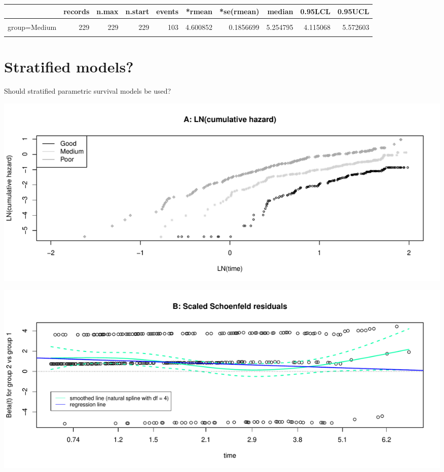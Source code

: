 \documentclass[]{article}
\begin{document}
\begin{table}[H]
\centering
\begin{tabular}{lrrrrrrrrr}
\toprule
  & records & n.max & n.start & events & *rmean & *se(rmean) & median & 0.95LCL & 0.95UCL\\
\midrule
\cellcolor{gray!6}{group=Good} & \cellcolor{gray!6}{229} & \cellcolor{gray!6}{229} & \cellcolor{gray!6}{229} & \cellcolor{gray!6}{51} & \cellcolor{gray!6}{5.934330} & \cellcolor{gray!6}{0.1616003} & \cellcolor{gray!6}{NA} & \cellcolor{gray!6}{NA} & \cellcolor{gray!6}{NA}\\
group=Medium & 229 & 229 & 229 & 103 & 4.600852 & 0.1856699 & 5.254795 & 4.115068 & 5.572603\\
\cellcolor{gray!6}{group=Poor} & \cellcolor{gray!6}{228} & \cellcolor{gray!6}{228} & \cellcolor{gray!6}{228} & \cellcolor{gray!6}{145} & \cellcolor{gray!6}{3.101736} & \cellcolor{gray!6}{0.1772520} & \cellcolor{gray!6}{2.183562} & \cellcolor{gray!6}{1.978082} & \cellcolor{gray!6}{2.619178}\\
\bottomrule
\end{tabular}
\end{table}

\newpage

\section{Stratified models?}\label{stratified-models}

Should stratified parametric survival models be used?

\begin{flushleft}\includegraphics[height=0.29\textheight]{Images/PH_assumption-1} \end{flushleft}

\begin{flushleft}\includegraphics[height=0.29\textheight]{Images/PH_assumption-2} \end{flushleft}
\end{document}
